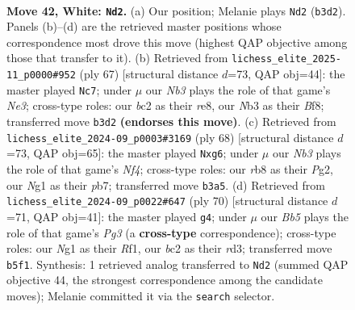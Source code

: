 \documentclass[11pt]{article}
\begin{document}
\clearpage

\begin{figure}[p]\centering
\begin{subfigure}{0.46\textwidth}\centering
\resizebox{\linewidth}{!}{%
\newchessgame
\chessboard[
  setfen={1r6/4r1k1/1p6/pBp1n3/P5p1/1NP3P1/K1b4P/4R1NR w - - 5 42},
  showmover=false,
  pgfstyle=straightmove, color=movearrow, markmove={b3-d2}
]}
\caption{}
\end{subfigure}\hfill
\begin{subfigure}{0.46\textwidth}\centering
\resizebox{\linewidth}{!}{%
\newchessgame
\chessboard[
  setfen={4Rbk1/5p2/2N1n1p1/1P5p/r1PB1P2/p5P1/P6P/2R3K1 b - - 0 34},
  showmover=false,
  pgfstyle=straightmove, color=movearrow, markmove={e6-c7}
]}
\caption{}
\end{subfigure}
\\[4pt]
\begin{subfigure}{0.46\textwidth}\centering
\resizebox{\linewidth}{!}{%
\newchessgame
\chessboard[
  setfen={3r2k1/1p1Prp1n/1p4p1/1P2b2p/5N1P/1B3P2/6P1/3R2K1 w - - 1 35},
  showmover=false,
  pgfstyle=straightmove, color=movearrow, markmove={f4-g6}
]}
\caption{}
\end{subfigure}\hfill
\begin{subfigure}{0.46\textwidth}\centering
\resizebox{\linewidth}{!}{%
\newchessgame
\chessboard[
  setfen={2k5/2r4p/2p1bpp1/P1R1p3/4P2P/3rN1P1/5P1K/5R2 w - - 1 36},
  showmover=false,
  pgfstyle=straightmove, color=movearrow, markmove={g3-g4}
]}
\caption{}
\end{subfigure}
\caption{\textbf{Move 42, White: \texttt{Nd2}.} (a) Our position; Melanie plays \texttt{Nd2} (\texttt{b3d2}). Panels (b)--(d) are the retrieved master positions whose correspondence most drove this move (highest QAP objective among those that transfer to it). (b) Retrieved from \texttt{lichess\_elite\_2025-11\_p0000\#952} (ply 67) [structural distance $d$=73, QAP obj=44]: the master played \texttt{Nc7}; under $\mu$ our \emph{Nb3} plays the role of that game's \emph{Ne3}; cross-type roles: our \emph{b}c2 as their \emph{r}e8, our \emph{N}b3 as their \emph{B}f8; transferred move \texttt{b3d2} \textbf{(endorses this move)}. (c) Retrieved from \texttt{lichess\_elite\_2024-09\_p0003\#3169} (ply 68) [structural distance $d$=73, QAP obj=65]: the master played \texttt{Nxg6}; under $\mu$ our \emph{Nb3} plays the role of that game's \emph{Nf4}; cross-type roles: our \emph{r}b8 as their \emph{P}g2, our \emph{N}g1 as their \emph{p}b7; transferred move \texttt{b3a5}. (d) Retrieved from \texttt{lichess\_elite\_2024-09\_p0022\#647} (ply 70) [structural distance $d$=71, QAP obj=41]: the master played \texttt{g4}; under $\mu$ our \emph{Bb5} plays the role of that game's \emph{Pg3} (a \textbf{cross-type} correspondence); cross-type roles: our \emph{N}g1 as their \emph{R}f1, our \emph{b}c2 as their \emph{r}d3; transferred move \texttt{b5f1}. Synthesis: 1 retrieved analog transferred to \texttt{Nd2} (summed QAP objective 44, the strongest correspondence among the candidate moves); Melanie committed it via the \texttt{search} selector.}
\label{fig:thought-m82}
\end{figure}
\end{document}
